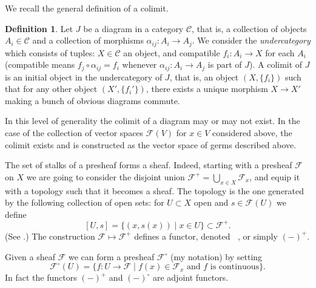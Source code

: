 \documentclass[12pt]{article}
\theoremstyle{plain}
\theoremstyle{definition}
\newtheorem{defn}{Definition}[section]
\numberwithin{equation}{section}
\DeclareMathOperator{\Et}{\acute{E}t}
\newcommand{\al}{\alpha}
\newcommand{\R}{\mathbb{R}}
\newcommand{\CC}{\mathcal{C}}
\newcommand{\CF}{\mathcal{F}}
\newcommand{\OO}{\mathcal{O}}
\begin{document}
We recall the general definition of a colimit.
\begin{defn}
Let $J$ be a diagram in a category $\CC$, that is, a collection of objects $A_i \in \CC$ and a collection of morphisms $\al_{ij} : A_i \rightarrow A_j$. We consider the \emph{undercategory} which consists of tuples: $X \in \CC$ an object, and compatible $f_i : A_i \rightarrow X$ for each $A_i$ (compatible means $f_j \circ \al_{ij} = f_i$ whenever $\al_{ij} : A_i \rightarrow A_j$ is part of $J$). A colimit of $J$ is an initial object in the undercategory of $J$, that is, an object $(X, \{f_i\})$ such that for any other object $(X', \{f_i'\})$, there exists a unique morphism $X \rightarrow X'$ making a bunch of obvious diagrams commute.
\end{defn}
In this level of generality the colimit of a diagram may or may not exist. In the case of the collection of vector spaces $\CF(V)$ for $x \in V$ considered above, the colimit exists and is constructed as the vector space of germs described above.


The set of stalks of a presheaf forms a sheaf. Indeed, starting with a presheaf $\CF$ on $X$ we are going to consider the disjoint union $\CF^+ = \bigcup_{x \in X} \CF_x$, and equip it with a topology such that it becomes a sheaf. The topology is the one generated by the following collection of open sets: for $U \subset X$ open and $s \in \CF(U)$ we define
\[
[U, s] = \{(x, s(x)) \mid x \in U\} \subset \CF^+.
\]
(See {\cite[Chap. II, Exercise 1.13]{Hartshorne}}.) The construction $\CF \mapsto \CF^+$ defines a functor, denoted $\Et$, or simply $(-)^+$.

Given a sheaf $\CF$ we can form a presheaf $\CF^\circ$ (my notation) by setting
\[
\CF^\circ(U) = \{f : U \rightarrow \CF \mid \text{$f(x) \in \CF_x$ and $f$ is continuous} \}.
\]
In fact the functors $(-)^+$ and $(-)^\circ$ are adjoint functors.
\end{document}
